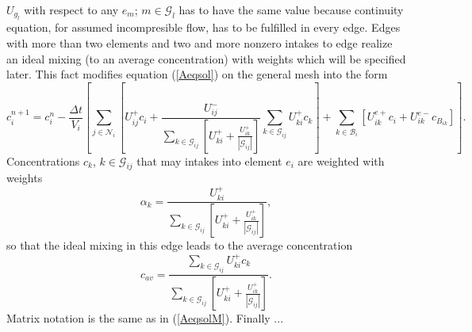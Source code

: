 $U_{g_{l}}$ with respect to any $e_m$; $m \in \mathcal{G}_{l}$ has to have the same value because continuity equation, for assumed incompresible flow, has to
 be fulfilled in every edge. Edges with more than two elements and two and more nonzero intakes to edge realize an ideal mixing (to an average concentration) 
with weights which will be specified later. This fact modifies equation (\ref{Aeqsol}) on the general mesh into the form
    \begin{equation}
      c_i^{n+1} = c_i^n - \frac{\Delta t}{V_{i}} \left[ \sum_{j \in \mathcal{N}_{i}} \left[ U_{ij}^{+} c_i +  \frac{U_{ij}^{-}}{\sum\limits_{k \in \mathcal{G}_{ij}}
      \left[ U_{ki}^{+} + \frac{U_{ik}^{+}}{|\mathcal{G}_{ij}|} \right] } \sum\limits_{k \in \mathcal{G}_{ij}} U_{ki}^{+} c_{k} \right] + 
      \sum_{k \in \mathcal{B}_{i}}  \left[  U_{ik}^{e+} c_i +  U_{ik}^{e-} c_{B_{ik}} \right] \right]. \label{Aeqsol2}
    \end{equation}
Concentrations $c_k$, $k \in \mathcal{G}_{ij}$ that may intakes into element $e_i$ are weighted with weights 
\begin{equation}
 \alpha_k = \frac{U_{ki}^{+}}{\sum\limits_{k \in \mathcal{G}_{ij}} \left[ U_{ki}^{+} + \frac{U_{ik}^{+}}{|\mathcal{G}_{ij}|} \right] }, \label{weights}
\end{equation}
so that the ideal mixing in this edge leads to the average concentration 
\begin{equation}
 c_{av} = \frac{\sum\limits_{k \in \mathcal{G}_{ij}} U_{ki}^{+} c_{k}}{\sum\limits_{k \in \mathcal{G}_{ij}} \left[ U_{ki}^{+} + \frac{U_{ik}^{+}}{|\mathcal{G}_{ij}|} \right] }. \label{cav}
\end{equation}
Matrix notation is the same as in (\ref{AeqsolM}). Finally ...